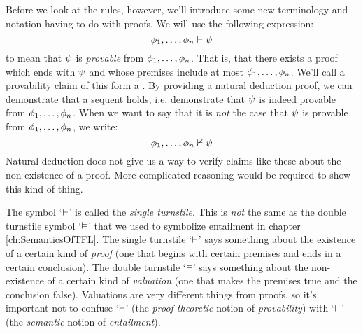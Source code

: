 Before we look at the rules, however, we'll introduce some new terminology and notation having to do with proofs.  We will use the following expression:
$$\mathcal{\phi}_1, \ldots, \mathcal{\phi}_n \vdash \mathcal{\psi}$$
to mean that $\mathcal{\psi}$ is \emph{provable} from $\mathcal{\phi}_1, \ldots, \mathcal{\phi}_n$.  That is, that there exists a proof which ends with $\mathcal{\psi}$ and whose premises include at most $\mathcal{\phi}_1, \ldots, \mathcal{\phi}_n$. We'll call a provability claim of this form a .  By providing a natural deduction proof, we can demonstrate that a sequent holds, i.e. demonstrate that $\mathcal{\psi}$ is indeed provable from $\mathcal{\phi}_1, \ldots, \mathcal{\phi}_n$.  When we want to say that it is \emph{not} the case that $\mathcal{\psi}$ is provable from $\mathcal{\phi}_1, \ldots, \mathcal{\phi}_n$, we write:
$$\mathcal{\phi}_1, \ldots, \mathcal{\phi}_n \nvdash \mathcal{\psi}$$
Natural deduction does not give us a way to verify claims like these about the non-existence of a proof. More complicated reasoning would be required to show this kind of thing.


The symbol `$\vdash$' is called the \emph{single turnstile}.  This is \emph{not} the same as the double turnstile symbol `$\vDash$' that we used to symbolize entailment in chapter \ref{ch:SemanticsOfTFL}. The single turnstile `$\vdash$' says something about the existence of a certain kind of \emph{proof} (one that begins with certain premises and ends in a certain conclusion).  The double turnstile `$\vDash$' says something about the non-existence of a certain kind of \emph{valuation} (one that makes the premises true and the conclusion false).  Valuations are very different things from proofs, so it's important not to confuse `$\vdash$' (the \emph{proof theoretic} notion of \emph{provability}) with `$\vDash$' (the \emph{semantic} notion of \emph{entailment}).


